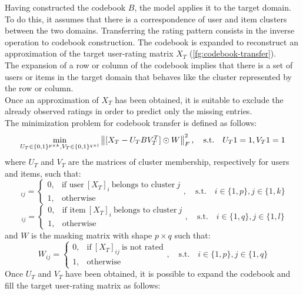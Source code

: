 Having constructed the codebook $B$, the model applies it to the target domain. To do this, it assumes that there is a correspondence of user and item clusters between the two domains. Transferring the rating pattern consists in the inverse operation to codebook construction. The codebook is expanded to reconstruct an approximation of the target user-rating matrix $X_T$ (\autoref{fg:codebook-transfer}).\\
The expansion of a row or column of the codebook implies that there is a set of users or items in the target domain that behaves like the cluster represented by the row or column.\\
Once an approximation of $X_T$ has been obtained, it is suitable to exclude the already observed ratings in order to predict only the missing entries.\\
The minimization problem for codebook transfer is defined as follows:
\begin{equation}
\min_{U_T \in \{0,1\}^{p \times k}, V_T \in \{0,1\}^{q \times l}} \left\lVert[X_T - U_T B V_T^T] \odot W\right\rVert_F^2, \quad \text{s.t.} \quad U_T 1 = 1, V_T 1 = 1
\end{equation}
where $U_T$ and $V_T$ are the matrices of cluster membership, respectively for users and items, such that:
\begin{equation}
[U_T]_{ij} =
\begin{cases}
0, & \text{if user}\ [X_T]_{i}\ \text{belongs to cluster}\ j\\
1, & \text{otherwise}
\end{cases}
, \quad \text{s.t.} \quad i \in \{1,p\}, j \in \{1,k\}
\end{equation}
\begin{equation}
[V_T]_{ij} =
\begin{cases}
0, & \text{if item}\ [X_T]_{i}\ \text{belongs to cluster}\ j\\
1, & \text{otherwise}
\end{cases}
, \quad \text{s.t.} \quad i \in \{1,q\}, j \in \{1,l\}
\end{equation}
and $W$ is the masking matrix with shape $p \times q$ such that:
\begin{equation}
W_{ij} =
\begin{cases}
0, & \text{if}\ [X_T]_{ij}\ \text{is not rated}\\
1, & \text{otherwise}
\end{cases}
, \quad \text{s.t.} \quad i \in \{1,p\}, j \in \{1,q\}
\end{equation}
Once $U_T$ and $V_T$ have been obtained, it is possible to expand the codebook and fill the target user-rating matrix as follows:
